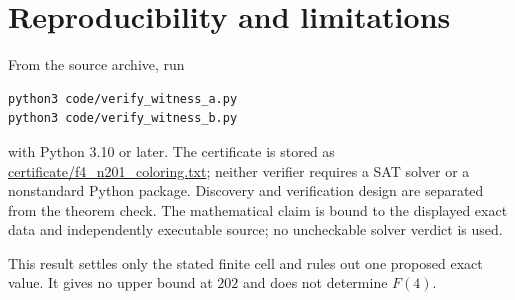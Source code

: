 \documentclass[11pt]{amsart}
\begin{document}
\section{Reproducibility and limitations}
From the source archive, run
\begin{verbatim}
python3 code/verify_witness_a.py
python3 code/verify_witness_b.py
\end{verbatim}
with Python 3.10 or later.  The certificate is stored as
\url{certificate/f4_n201_coloring.txt}; neither verifier requires a SAT
solver or a nonstandard Python package.  Discovery and verification design
are separated from the theorem check.  The mathematical claim is bound to the
displayed exact data and independently executable source; no uncheckable
solver verdict is used.

This result settles only the stated finite cell and rules out one proposed
exact value.  It gives no upper bound at $202$ and does not determine $F(4)$.



\end{document}
